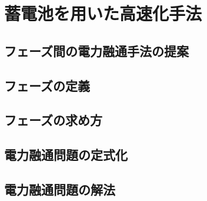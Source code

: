 \chapter{蓄電池を用いた高速化手法}
\label{chap:proposal}



\section{フェーズ間の電力融通手法の提案}
\label{sec:curb}


\section{フェーズの定義}
\label{sec:phase}


\section{フェーズの求め方}
\label{sec:phase}


\section{電力融通問題の定式化}
\label{sec:formularization}


\section{電力融通問題の解法}
\label{sec:algorithm}


